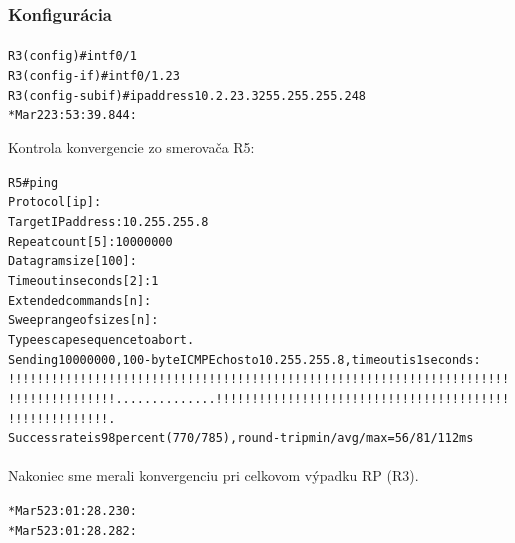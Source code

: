 \documentclass[12pt,twoside,a4paper]{report}
\begin{document}
\subsubsection{Konfigurácia}
\paragraph{}

\noindent
{\selectfont
\begin{small}
\begin{alltt}
R3(config)#int f0/1 
R3(config-if)#int f0/1.23     
R3(config-subif)#ip address 10.2.23.3 255.255.255.248
*Mar  2 23:53:39.844: %

\end{alltt}
\end{small}
}


Kontrola konvergencie zo smerovača R5:

\noindent
{\selectfont
\begin{small}
\begin{alltt}

R5#ping        
Protocol [ip]:             
Target IP address: 10.255.255.8
Repeat count [5]: 10000000    
Datagram size [100]:
Timeout in seconds [2]: 1           
Extended commands [n]:
Sweep range of sizes [n]:
Type escape sequence to abort.
Sending 10000000, 100-byte ICMP Echos to 10.255.255.8, timeout is 1 seconds:
!!!!!!!!!!!!!!!!!!!!!!!!!!!!!!!!!!!!!!!!!!!!!!!!!!!!!!!!!!!!!!!!!!!!!!
!!!!!!!!!!!!!!!..............!!!!!!!!!!!!!!!!!!!!!!!!!!!!!!!!!!!!!!!!!
!!!!!!!!!!!!!!.
Success rate is 98 percent (770/785), round-trip min/avg/max = 56/81/112 ms

\end{alltt}
\end{small}
}

\paragraph{}
Nakoniec sme merali konvergenciu pri celkovom výpadku RP (R3).

\noindent
{\selectfont
\begin{small}
\begin{alltt}
*Mar  5 23:01:28.230: %
*Mar  5 23:01:28.282: %
\end{alltt}
\end{small}
}
\end{document}
